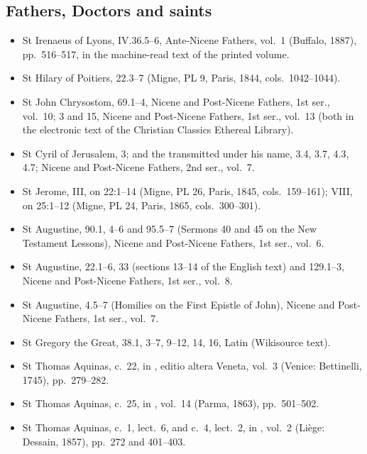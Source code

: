 {\subsection*{Fathers, Doctors and saints}
\begin{itemize}[itemsep=0pt,topsep=.25em]
\item St Irenaeus of Lyons,  IV.36.5--6, Ante-Nicene Fathers, vol.~1 (Buffalo, 1887), pp.~516--517, in the machine-read text of the printed volume.
\item St Hilary of Poitiers,  22.3--7 (Migne, PL 9, Paris, 1844, cols.~1042--1044).
\item St John Chrysostom,  69.1--4, Nicene and Post-Nicene Fathers, 1st ser., vol.~10;  3 and  15, Nicene and Post-Nicene Fathers, 1st ser., vol.~13 (both in the electronic text of the Christian Classics Ethereal Library).
\item St Cyril of Jerusalem,  3; and the  transmitted under his name, 3.4, 3.7, 4.3, 4.7; Nicene and Post-Nicene Fathers, 2nd ser., vol.~7.
\item St Jerome,  III, on 22:1--14 (Migne, PL 26, Paris, 1845, cols.~159--161);  VIII, on 25:1--12 (Migne, PL 24, Paris, 1865, cols.~300--301).
\item St Augustine,  90.1, 4--6 and 95.5--7 (Sermons 40 and 45 on the New Testament Lessons), Nicene and Post-Nicene Fathers, 1st ser., vol.~6.
\item St Augustine,  22.1--6, 33 (sections 13--14 of the English text) and 129.1--3, Nicene and Post-Nicene Fathers, 1st ser., vol.~8.
\item St Augustine,  4.5--7 (Homilies on the First Epistle of John), Nicene and Post-Nicene Fathers, 1st ser., vol.~7.
\item St Gregory the Great,  38.1, 3--7, 9--12, 14, 16, Latin (Wikisource text).
\item St Thomas Aquinas,  c.~22, in , editio altera Veneta, vol.~3 (Venice: Bettinelli, 1745), pp.~279--282.
\item St Thomas Aquinas,  c.~25, in , vol.~14 (Parma, 1863), pp.~501--502.
\item St Thomas Aquinas,  c.~1, lect.~6, and  c.~4, lect.~2, in , vol.~2 (Li\`ege: Dessain, 1857), pp.~272 and 401--403.

\end{itemize}}
